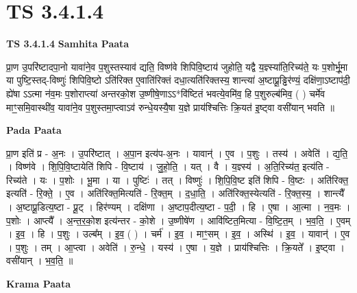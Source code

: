\documentclass[17pt]{extarticle}
\begin{document}
\section{ TS 3.4.1.4 }

\textbf{TS 3.4.1.4 } \newline
\textbf{Samhita Paata} \newline

प्रा॒ण उ॒परि॑ष्टादपा॒नो यावा॑ने॒व प॒शुस्तस्याव॑ द्यति॒ विष्ण॑वे शिपिवि॒ष्टाय॑ जुहोति॒ यद्वै य॒ज्ञ्स्या॑ति॒रिच्य॑ते॒ यः प॒शोर्भू॒मा या पुष्टि॒स्तद्-विष्णुः॑ शिपिवि॒ष्टो ऽति॑रिक्त ए॒वाति॑रिक्तं दधा॒त्यति॑रिक्तस्य॒ शान्त्या॑ अ॒ष्टाप्रू॒ड्ढिर॑ण्यं॒ दक्षि॑णा॒ऽष्टाप॑दी॒ ह्ये॑षा ऽऽत्मा न॑व॒मः प॒शोराप्त्या॑ अन्तरको॒श उ॒ष्णीषे॒णाऽऽ*वि॑ष्टितं भवत्ये॒वमि॑व॒ हि प॒शुरुल्ब॑मिव॒ ( ) चर्मे॑व माꣳ॒॒समि॒वास्थी॑व॒ यावा॑ने॒व प॒शुस्तमा॒प्त्वाऽव॑ रुन्धे॒यस्यै॒षा य॒ज्ञे प्राय॑श्चित्तिः क्रि॒यत॑ इ॒ष्ट्वा वसी॑यान् भवति ॥ \newline

\textbf{Pada Paata} \newline

प्रा॒ण इति॑ प्र - अ॒नः । उ॒परि॑ष्टात् । अ॒पा॒न इत्य॑प-अ॒नः । यावान्॑ । ए॒व । प॒शुः । तस्य॑ । अवेति॑ । द्य॒ति॒ । विष्ण॑वे । शि॒पि॒वि॒ष्टायेति॑ शिपि - वि॒ष्टाय॑ । जु॒हो॒ति॒ । यत् । वै । य॒ज्ञ्स्य॑ । अ॒ति॒रिच्य॑त॒ इत्य॑ति - रिच्य॑ते । यः । प॒शोः । भू॒मा । या । पुष्टिः॑ । तत् । विष्णुः॑ । शि॒पि॒वि॒ष्ट इति॑ शिपि - वि॒ष्टः । अति॑रिक्त॒ इत्यति॑ - रि॒क्ते॒ । ए॒व । अति॑रिक्त॒मित्यति॑ - रि॒क्त॒म् । द॒धा॒ति॒ । अति॑रिक्त॒स्येत्यति॑ - रि॒क्त॒स्य॒ । शान्त्यै᳚ । अ॒ष्टाप्रू॒डित्य॒ष्टा - प्रू॒ट् । हिर॑ण्यम् । दक्षि॑णा । अ॒ष्टाप॒दीत्य॒ष्टा - प॒दी॒ । हि । ए॒षा । आ॒त्मा । न॒व॒मः । प॒शोः । आप्त्यै᳚ । अ॒न्त॒र॒को॒श इत्य॑न्तर - को॒शे । उ॒ष्णीषे॑ण । आवि॑ष्टित॒मित्या - वि॒ष्टि॒त॒म् । भ॒व॒ति॒ । ए॒वम् । इ॒व॒ । हि । प॒शुः । उल्ब᳚म् । इ॒व॒ ( ) । चर्म॑ । इ॒व॒ । माꣳ॒॒सम् । इ॒व॒ । अस्थि॑ । इ॒व॒ । यावान्॑ । ए॒व । प॒शुः । तम् । आ॒प्त्वा । अवेति॑ । रु॒न्धे॒ । यस्य॑ । ए॒षा । य॒ज्ञे । प्राय॑श्चित्तिः । क्रि॒यते᳚ । इ॒ष्ट्वा । वसी॑यान् । भ॒व॒ति॒ ॥  \newline


\textbf{Krama Paata} \newline
\end{document}
